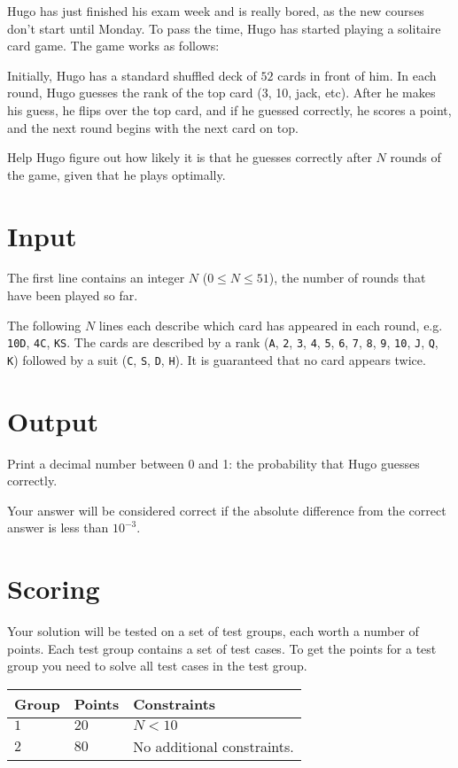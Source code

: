 Hugo has just finished his exam week and is really bored, as the new courses don't start until Monday.
To pass the time, Hugo has started playing a solitaire card game. The game works as follows:

Initially, Hugo has a standard shuffled deck of $52$ cards in front of him. In each round, Hugo guesses the rank of the top card (3, 10, jack, etc).
After he makes his guess, he flips over the top card, and if he guessed correctly, he scores a point, and the next round begins with the next card on top.

Help Hugo figure out how likely it is that he guesses correctly after $N$ rounds of the game, given that he plays optimally.

\section*{Input}
The first line contains an integer $N$ ($0 \le N \le 51$), the number of rounds that have been played so far.

The following $N$ lines each describe which card has appeared in each round, e.g. \texttt{10D}, \texttt{4C}, \texttt{KS}.
The cards are described by a rank (\texttt{A}, \texttt{2}, \texttt{3}, \texttt{4}, \texttt{5}, \texttt{6}, \texttt{7}, \texttt{8},
\texttt{9}, \texttt{10}, \texttt{J}, \texttt{Q}, \texttt{K}) followed by a suit (\texttt{C}, \texttt{S}, \texttt{D}, \texttt{H}).
It is guaranteed that no card appears twice.

\section*{Output}
Print a decimal number between 0 and 1: the probability that Hugo guesses correctly.

Your answer will be considered correct if the absolute difference from the correct answer is less than $10^{-3}$.


\section*{Scoring}
Your solution will be tested on a set of test groups, each worth a number of points. Each test group contains
a set of test cases. To get the points for a test group you need to solve all test cases in the test group.

\noindent
\begin{tabular}{| l | l | p{12cm} |}
  \hline
  \textbf{Group} & \textbf{Points} & \textbf{Constraints} \\ \hline
  $1$    & $20$       & $N < 10$ \\ \hline
  $2$    & $80$       & No additional constraints. \\ \hline
\end{tabular}
